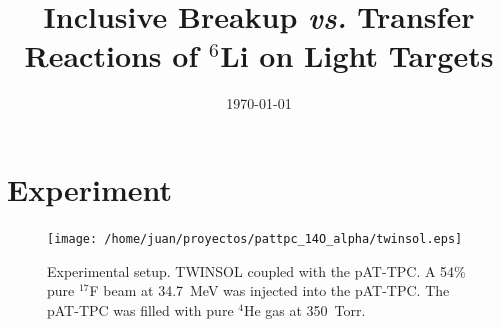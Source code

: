 \documentclass[aps,prc,onecolumn,amsmath,amssymb, preprint, 12pt]{revtex4-1}
\begin{document}


\title{  Inclusive Breakup \textit{vs.} Transfer Reactions of ${}^{6}$Li on Light Targets }









   
   
\date{\today}






\section{Experiment}



\begin{figure}[!ht]
\centering
\texttt{[image: /home/juan/proyectos/pattpc\_14O\_alpha/twinsol.eps]}
 \caption{\label{setup}  Experimental setup. TWINSOL coupled with the pAT-TPC. A 54\% pure ${}^{17}$F beam at 34.7~MeV was injected into the pAT-TPC. The pAT-TPC was filled with pure ${}^{4}$He gas at 350~Torr. }
 \end{figure}
\end{document}
